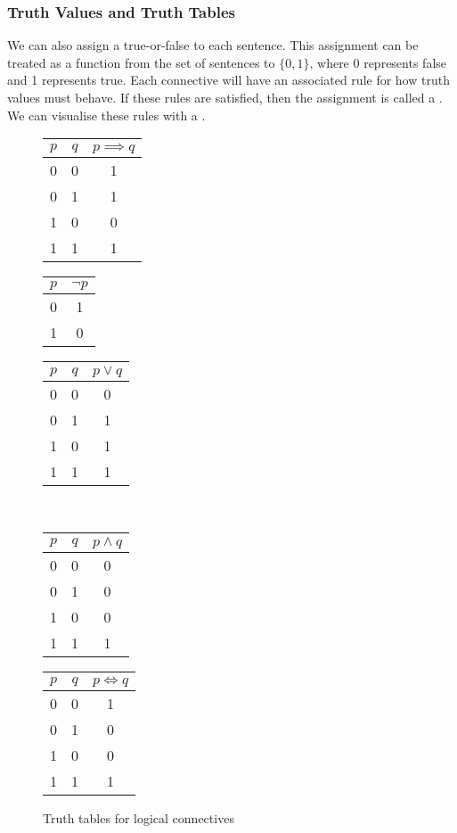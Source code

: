 \documentclass[11pt]{article}
\begin{document}
\subsubsection{Truth Values and Truth Tables}
We can also assign a true-or-false  to each sentence. This assignment can be treated as a function from the set of sentences to $\{0, 1 \}$, where 0 represents false and 1 represents true.  Each connective will have an associated rule for how truth values must behave. If these rules are satisfied, then the assignment is called a . We can visualise these rules with a . 
\begin{figure}[H]
    \caption{Truth tables for logical connectives}
    \label{fig:truthTablesLogicalConnectives}
    \centering
    \begin{tabular}{|c|c||c|}
        \hline
        $p$ & $q$ & $p \implies q$ \\ \hline
        0 & 0 & 1 \\
        0 & 1 & 1 \\
        1 & 0 & 0 \\
        1 & 1 & 1 \\ \hline
    \end{tabular}\quad
    \begin{tabular}{|c||c|}
        \hline
        $p$ & $\neg p$  \\ \hline
        0 & 1 \\
        1 & 0 \\\hline
    \end{tabular}\quad
    \begin{tabular}{|c|c||c|}
        \hline
        $p$ & $q$ & $p \lor q$ \\ \hline
        0 & 0 & 0 \\
        0 & 1 & 1 \\
        1 & 0 & 1 \\
        1 & 1 & 1 \\ \hline
    \end{tabular}\\
    \begin{tabular}{|c|c||c|}
        \hline
        $p$ & $q$ & $p \land q$ \\ \hline
        0 & 0 & 0 \\
        0 & 1 & 0 \\
        1 & 0 & 0 \\
        1 & 1 & 1 \\ \hline
    \end{tabular}\quad
    \begin{tabular}{|c|c||c|}
        \hline
        $p$ & $q$ & $p \iff q$ \\ \hline
        0 & 0 & 1 \\
        0 & 1 & 0 \\
        1 & 0 & 0 \\
        1 & 1 & 1 \\ \hline
    \end{tabular}
\end{figure}
\end{document}
